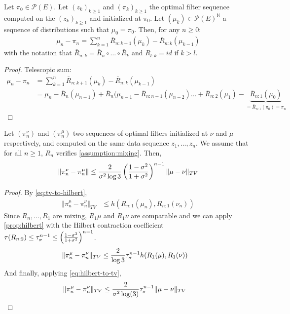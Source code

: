 \begin{proposition}
Let $\pi_0\in\mathcal P(E)$. Let $(z_k)_{k\geq 1}$ and $(\pi_k)_{k\geq 1}$ the optimal filter sequence computed on the $(z_k)_{k\geq 1}$ and initialized at $\pi_0$. Let $(\mu_k)\in\mathcal P(E)^\mathbb N$ a sequence of distributions such that $\mu_0 = \pi_0$. Then, for any $n\geq 0$:
\begin{align}\label{eq:telescopic}
    \mu_n - \pi_n = \sum_{k=1}^n \bar R_{n:k+1}(\mu_k) - \bar R_{n:k}(\mu_{k-1})
\end{align}
with the notation that $\bar R_{n:k} = \bar R_n \circ \dots \circ \bar R_k$ and $R_{l:k}=id$ if $k > l$.
\end{proposition}
\begin{proof}
    Telescopic sum:
\begin{align}
    \mu_n - \pi_n &= \sum_{k=1}^n \bar R_{n:k+1}(\mu_k) - \bar R_{n:k}(\mu_{k-1})\\
    &= \mu_n - \bar R_n(\mu_{n-1}) + \bar R_{n}(\mu_{n-1} - \bar R_{n:n-1}(\mu_{n-2}) \ldots + \bar R_{n:2}(\mu_1) - \underbrace{\bar R_{n:1}(\mu_0)}_{=\bar R_{n:1}(\pi_0)=\pi_n}
\end{align}
\end{proof}



\begin{proposition}\label{prop:optimal-forgetting}
Let $(\pi_n^\nu)$ and $(\pi_n^\mu)$ two sequences of optimal filters initialized at $\nu$ and $\mu$ respectively, and computed on the same data sequence $z_1, \ldots, z_n$. We assume that for all $n\geq 1$, $R_n$ verifies \cref{assumption:mixing}. Then,
\begin{align}
    \Vert \pi^\nu_n - \pi^\mu_n \Vert \leq \frac{2}{\sigma^2\log 3}\left(\frac{1 - \sigma^2}{1 + \sigma^2}\right)^{n-1}\Vert \mu - \nu \Vert_{TV}
\end{align}
\end{proposition}

\begin{proof}
   By \cref{eq:tv-to-hilbert},
\begin{align}
    \Vert \pi^\mu_n - \pi^\nu_n \Vert_{TV} & \leq h(R_{n:1}(\mu_n), R_{n:1}(\nu_n))
\end{align}
Since $R_{n}, \ldots, R_1$ are mixing, $R_{1}\mu$ and $R_1\nu$ are comparable and we can apply \cref{prop:hilbert} with the Hilbert contraction coefficient $\tau(R_{n:2})\leq \tau_\sigma^{n-1}\leq\left(\frac{1-\sigma^2}{1+\sigma^2}\right)^{n-1}$.
\begin{align}
    \Vert \pi^\mu_n - \pi^\nu_n \Vert_{TV} & \leq \frac{2}{\log 3}\tau_\sigma^{n-1}h(R_{1}(\mu), R_{1}(\nu))
\end{align}
And finally, applying \cref{eq:hilbert-to-tv},
\begin{align}
    \Vert \pi^\mu_n - \pi^\nu_n \Vert_{TV} & \leq \frac{2}{\sigma^2\log(3)}\tau_\sigma^{n-1}\Vert \mu - \nu\Vert_{TV}
\end{align}
\end{proof}


